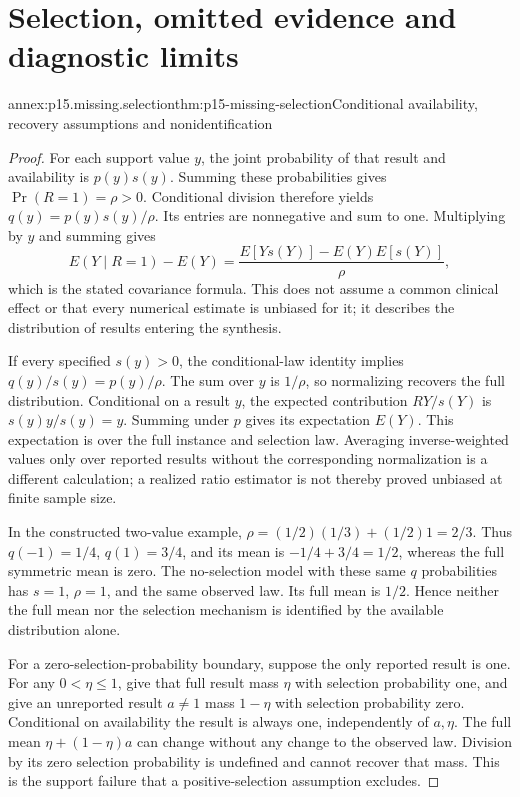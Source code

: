 \section{Selection, omitted evidence and diagnostic limits}

\begin{annexitem}{annex:p15.missing.selection}{thm:p15-missing-selection}{Conditional availability, recovery assumptions and nonidentification}
\begin{proof}
For each support value \(y\), the joint probability of that result
and availability is \(p(y)s(y)\). Summing these probabilities gives
\(\Pr(R=1)=\rho>0\). Conditional division therefore yields
\(q(y)=p(y)s(y)/\rho\). Its entries are nonnegative and sum to
one. Multiplying by \(y\) and summing gives
\[
 E(Y\mid R=1)-E(Y)
 =\frac{E[Ys(Y)]-E(Y)E[s(Y)]}{\rho},
\]
which is the stated covariance formula. This does not assume a common
clinical effect or that every numerical estimate is unbiased for it;
it describes the distribution of results entering the synthesis.

If every specified \(s(y)>0\), the conditional-law identity implies
\(q(y)/s(y)=p(y)/\rho\). The sum over \(y\) is \(1/\rho\),
so normalizing recovers the full distribution. Conditional on a result
\(y\), the expected contribution \(RY/s(Y)\) is
\(s(y)y/s(y)=y\). Summing under \(p\) gives its expectation
\(E(Y)\). This expectation is over the full instance and selection
law. Averaging inverse-weighted values only over reported results without
the corresponding normalization is a different calculation; a realized
ratio estimator is not thereby proved unbiased at finite sample size.

In the constructed two-value example,
\(\rho=(1/2)(1/3)+(1/2)1=2/3\).
Thus \(q(-1)=1/4\), \(q(1)=3/4\), and its mean is
\(-1/4+3/4=1/2\), whereas the full symmetric mean is zero.
The no-selection model with these same \(q\) probabilities has
\(s=1\), \(\rho=1\), and the same observed law. Its full
mean is \(1/2\). Hence neither the full mean nor the selection
mechanism is identified by the available distribution alone.

For a zero-selection-probability boundary, suppose the only reported
result is one. For any \(0<\eta\leq1\), give that full result
mass \(\eta\) with selection probability one, and give an unreported
result \(a\ne1\) mass \(1-\eta\) with selection probability zero.
Conditional on availability the result is always one, independently
of \(a,\eta\). The full mean \(\eta+(1-\eta)a\) can change
without any change to the observed law. Division by its zero selection
probability is undefined and cannot recover that mass. This is the
support failure that a positive-selection assumption excludes.
\end{proof}
\end{annexitem}

